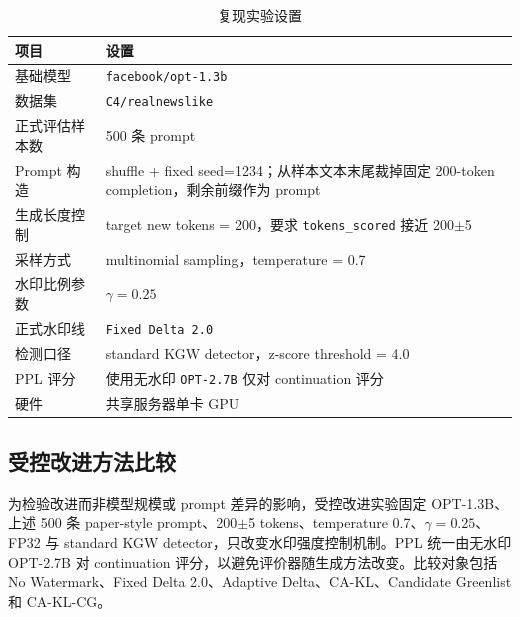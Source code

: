 \documentclass[a4paper,UTF8,zihao=5]{ctexart}
\newcommand{\method}{CA-KL}
\newcommand{\fullmethod}{CA-KL-CG}
\begin{document}
\begin{table}[H]
    \centering
    \caption{复现实验设置}
    \label{tab:setup}
    \begin{tabularx}{0.92\textwidth}{p{}X}
        \toprule
        项目        & 设置                                                                       \\
        \midrule
        基础模型      & \texttt{facebook/opt-1.3b}                                               \\
        数据集       & \texttt{C4/realnewslike}                                                 \\
        正式评估样本数   & 500 条 prompt                                                             \\
        Prompt 构造 & shuffle + fixed seed=1234；从样本文本末尾裁掉固定 200-token completion，剩余前缀作为 prompt \\
        生成长度控制    & target new tokens = 200，要求 \texttt{tokens\_scored} 接近 200$\pm$5          \\
        采样方式      & multinomial sampling，temperature = 0.7                                   \\
        水印比例参数    & $\gamma=0.25$                                                            \\
        正式水印线     & \texttt{Fixed Delta 2.0}                                                 \\
        检测口径      & standard KGW detector，z-score threshold = 4.0                            \\
        PPL 评分    & 使用无水印 \texttt{OPT-2.7B} 仅对 continuation 评分                               \\
        硬件        & 共享服务器单卡 GPU                                                              \\
        \bottomrule
    \end{tabularx}
\end{table}

\subsection{受控改进方法比较}

为检验改进而非模型规模或 prompt 差异的影响，受控改进实验固定 OPT-1.3B、上述 500 条 paper-style prompt、200$\pm$5 tokens、temperature 0.7、$\gamma=0.25$、FP32 与 standard KGW detector，只改变水印强度控制机制。PPL 统一由无水印 OPT-2.7B 对 continuation 评分，以避免评价器随生成方法改变。比较对象包括 No Watermark、Fixed Delta 2.0、Adaptive Delta、\method{}、Candidate Greenlist 和 \fullmethod{}。
\end{document}
